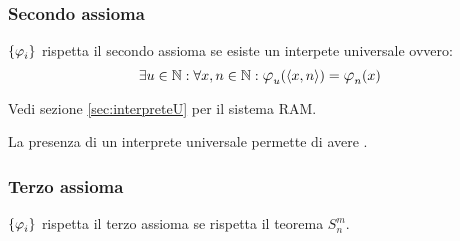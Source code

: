 \subsubsection*{Secondo assioma}
$\sistProg$ rispetta il secondo assioma se esiste un interpete universale ovvero:
$$ \exists u\in\N : \forall x,n\in\N: \semRAM_u(\cantor{x,n})=
\semRAM_n(x) $$

Vedi sezione \ref{sec:interpreteU} per il sistema RAM.

La presenza di un interprete universale permette di avere .

\subsubsection*{Terzo assioma}
$\sistProg$ rispetta il terzo assioma se rispetta il teorema $S_n^m$.

